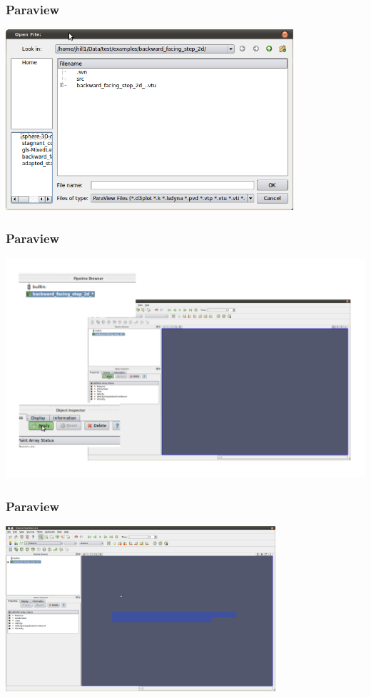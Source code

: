 \documentclass[12pt]{beamer}
\begin{document}
\begin{frame}
    \frametitle{Paraview}
\begin{center}
\includegraphics[width=0.8\textwidth]{images/paraview_open.png}
\end{center}
\end{frame}
\begin{frame}
    \frametitle{Paraview}
\begin{center}
\includegraphics[width=\textwidth]{images/paraview_after_open.png}
\end{center}
\end{frame}
\begin{frame}
    \frametitle{Paraview}
\begin{center}
\includegraphics[width=0.75\textwidth]{images/paraview_after_loading.png}
\end{center}
\end{frame}
\end{document}
